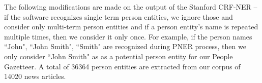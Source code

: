 
The following modifications are made on the output of the Stanford CRF-NER -- if the software recognizes single term person entities, we ignore those and consider only multi-term person entities and if a person entity's name is repeated multiple times, then we consider it only once. For example, if the person names ``John", ``John Smith", ``Smith" are recognized during PNER process, then we only consider ``John Smith" as as a potential person entity for our People Gazetteer.  
A total of 36364 person entities are extracted from our corpus of 14020 news articles.  
